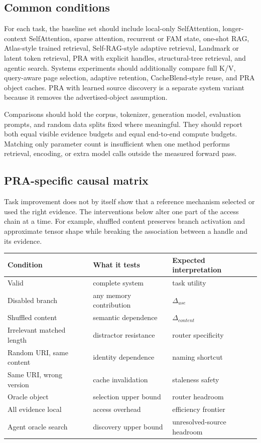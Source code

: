 \documentclass[10pt,a4paper]{article}
\begin{document}
\subsection{Common conditions}
For each task, the baseline set should include local-only SelfAttention, longer-context
SelfAttention, sparse attention, recurrent or FAM state, one-shot RAG, Atlas-style trained
retrieval, Self-RAG-style adaptive retrieval, Landmark or latent token retrieval, PRA with
explicit handles, structural-tree retrieval, and agentic search. Systems experiments
should additionally compare full K/V, query-aware page selection, adaptive retention,
CacheBlend-style reuse, and PRA object caches. PRA with learned source discovery is a
separate system variant because it removes the advertised-object assumption.

Comparisons should hold the corpus, tokenizer, generation model, evaluation prompts,
and random data splits fixed where meaningful.  They should report both equal visible
evidence budgets and equal end-to-end compute budgets.  Matching only parameter count is
insufficient when one method performs retrieval, encoding, or extra model calls outside
the measured forward pass.

\subsection{PRA-specific causal matrix}
Task improvement does not by itself show that a reference mechanism selected or used the
right evidence.  The interventions below alter one part of the access chain at a time.
For example, shuffled content preserves branch activation and approximate tensor shape
while breaking the association between a handle and its evidence.
\begin{center}
\begin{tabular}{lll}
\toprule
Condition & What it tests & Expected interpretation\\\midrule
Valid & complete system & task utility\\
Disabled branch & any memory contribution & $\Delta_{use}$\\
Shuffled content & semantic dependence & $\Delta_{content}$\\
Irrelevant matched length & distractor resistance & router specificity\\
Random URI, same content & identity dependence & naming shortcut\\
Same URI, wrong version & cache invalidation & staleness safety\\
Oracle object & selection upper bound & router headroom\\
All evidence local & access overhead & efficiency frontier\\
Agent oracle search & discovery upper bound & unresolved-source headroom\\
\bottomrule
\end{tabular}
\end{center}
\end{document}
